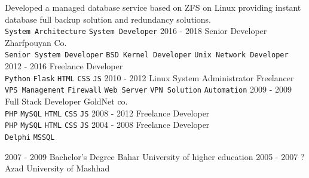 \documentclass[12pt]{developercv}
\begin{document}
\begin{entrylist}
{		Developed a managed database service based on ZFS on Linux
		providing instant database full backup solution and
		redundancy solutions.
		\\
		\texttt{System Architecture}\slashsep
		\texttt{System Developer}
		}
	\entry
		{2016 - 2018}
		{Senior Developer}
		{Zharfpouyan Co.}
		{\lorem \lorem \lorem\\
		\texttt{Senior System Developer}\slashsep
		\texttt{BSD Kernel Developer}\slashsep
		\texttt{Unix Network Developer}
		}
	\entry
		{2012 - 2016}
		{Freelance Developer}
		{}
		{\lorem \lorem \lorem\\
		\texttt{Python}\slashsep
		\texttt{Flask}\slashsep
		\texttt{HTML}\slashsep
		\texttt{CSS}\slashsep
		\texttt{JS}
		}
	\entry
		{2010 - 2012}
		{Linux System Administrator}
		{Freelancer}
		{\lorem \lorem \lorem\\
		\texttt{VPS Management}\slashsep
		\texttt{Firewall}\slashsep
		\texttt{Web Server}\slashsep
		\texttt{VPN Solution}\slashsep
		\texttt{Automation}
		}
	\entry
		{2009 - 2009}
		{Full Stack Developer}
		{GoldNet co.}
		{\lorem \lorem \lorem\\
		\texttt{PHP}\slashsep
		\texttt{MySQL}\slashsep
		\texttt{HTML}\slashsep
		\texttt{CSS}\slashsep
		\texttt{JS}
		}
	\entry
		{2008 - 2012}
		{Freelance Developer}
		{}
		{\lorem \lorem \lorem\\
		\texttt{PHP}\slashsep
		\texttt{MySQL}\slashsep
		\texttt{HTML}\slashsep
		\texttt{CSS}\slashsep
		\texttt{JS}
		}
	\entry
		{2004 - 2008}
		{Freelance Developer}
		{}
		{\lorem \lorem \lorem\\
		\texttt{Delphi}\slashsep
		\texttt{MSSQL}
		}
\end{entrylist}



\begin{entrylist}
	\entry
		{2007 - 2009}
		{Bachelor's Degree}
		{Bahar University of higher education}
		{\lorem\lorem}
	\entry
		{2005 - 2007}
		{?}
		{Azad University of Mashhad}
		{\lorem\lorem\lorem}
\end{entrylist}

\end{document}
